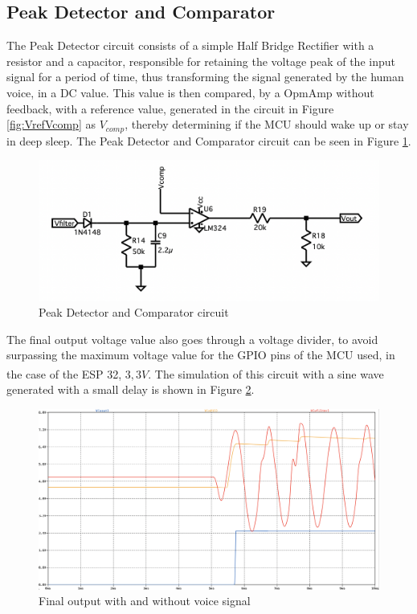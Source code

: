 \subsection{Peak Detector and Comparator}

The Peak Detector circuit consists of a simple Half Bridge Rectifier with a resistor and a capacitor, responsible for retaining the voltage peak of the input signal for a period of time, thus transforming the signal generated by the human voice, in a DC value. This value is then compared, by a OpmAmp without feedback, with a reference value, generated in the circuit in Figure \ref{fig:VrefVcomp} as $V_{comp}$, thereby determining if the MCU should wake up or stay in deep sleep. The Peak Detector and Comparator circuit can be seen in Figure \ref{fig:PeakandComp}.

\begin{figure}[H]
    \centering
    \includegraphics*[scale = 0.4]{Images/PeakandComp.png}
    \caption{Peak Detector and Comparator circuit}
    \label{fig:PeakandComp}
\end{figure}

The final output voltage value also goes through a voltage divider, to avoid surpassing the maximum voltage value for the GPIO pins of the MCU used, in the case of the ESP 32, $3,3V$\textsuperscript{\cite{ESP32-datasheet}}. The simulation of this circuit with a sine wave generated with a small delay is shown in Figure \ref{fig:SimPeakandComp}.

\begin{figure}[H]
    \centering
    \includegraphics*[scale = 0.25]{Images/SimPeakandComp.png}
    \caption{Final output with and without voice signal}
    \label{fig:SimPeakandComp}
\end{figure}
